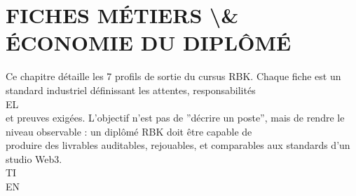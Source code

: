 \section{FICHES MÉTIERS \textbackslash{}& ÉCONOMIE DU DIPLÔMÉ}
\vspace{0.5em}
\vspace{0.5em}
Ce chapitre détaille les 7 profils de sortie du cursus RBK. Chaque fiche est un standard industriel définissant les attentes, responsabilités\\
\vspace{0.5em}
\vspace{0.5em}
\vspace{0.5em}
\vspace{0.5em}
EL\\
et preuves exigées. L’objectif n’est pas de ”décrire un poste”, mais de rendre le niveau observable : un diplômé RBK doit être capable de\\
produire des livrables auditables, rejouables, et comparables aux standards d’un studio Web3.\\
\vspace{0.5em}
\vspace{0.5em}
\vspace{0.5em}
\vspace{0.5em}
TI\\
EN\\
